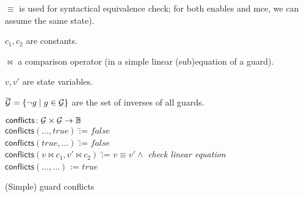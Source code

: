 \documentclass{paper}
\begin{document}
\newcommand\vars{\ensuremath{\mathcal{V}}\xspace}
\newcommand\visible{\ensuremath{\mathit{vis}}\xspace}
\newcommand\nguards{\overline{\guards}\xspace}

\newcommand\nes{\textsf{nes}\xspace}
\newcommand\nds{\textsf{nds}\xspace}
\newcommand\enables{\textsf{enables}\xspace}
\newcommand\agrees{\textsf{agrees}\xspace}
\newcommand\mce{\textsf{mce}\xspace}
\newcommand\conflicts{\textsf{conflicts}\xspace}
\newcommand\true{\ensuremath{\mathit{true}}\xspace}
\newcommand\false{\ensuremath{\mathit{false}}\xspace}

\newcommand\tie{\bowtie\hspace{1ex}}


$\equiv$ is used for syntactical equivalence check;
for both \enables and \mce, we can assume the same state).

$c_1, c_2$ are constants.

$\bowtie$ a comparison operator (in a simple linear (sub)equation
of a guard).

$v,v'$ are state variables.

$\nguards = \{ \neg g \mid g\in\guards\}$ are the set of inverses of all
guards.




\newcommand*{\Comment}[1]{\hfill\makebox[3cm][r]{\textit{$\triangleright$#1}}}%

\begin{algorithm}[p]
\begin{ntabbing}\hspace{-.8ex}
$\conflicts\colon \guards \times \guards \rightarrow \bool$\label{}\\
$\conflicts(\dots, \true)$ \=:= \false\label{}\\
$\conflicts(\true, \dots)$ \=:= \false\label{}\\
$\conflicts(v \bowtie c_1, v'\bowtie c_2)$ \=:= $v\equiv v'\land$
\textit{check linear equation}
\label{}\\
$\conflicts(\dots, \dots)$ \>:= $\true$ \Comment{unknown}
\label{}\\
\end{ntabbing}\vspace{-2em}
\caption{(Simple) guard conflicts}
\end{algorithm}
\vspace{-3em}
\end{document}
